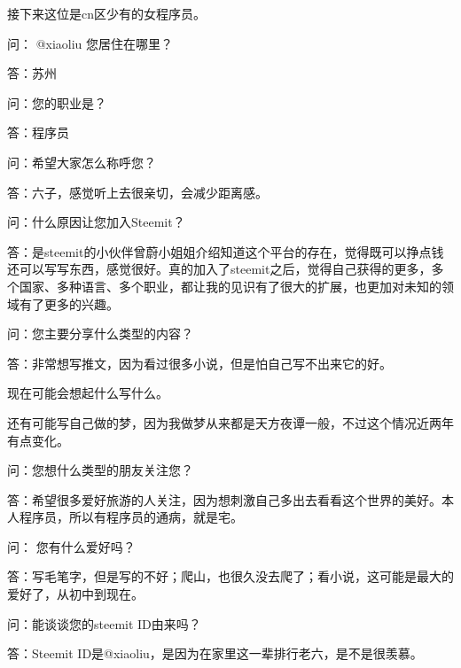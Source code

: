 \documentclass[]{ctexbook}
\begin{document}
接下来这位是cn区少有的女程序员。

问： @xiaoliu 您居住在哪里？

答：苏州

问：您的职业是？

答：程序员

问：希望大家怎么称呼您？

答：六子，感觉听上去很亲切，会减少距离感。

问：什么原因让您加入Steemit？

答：是steemit的小伙伴曾蔚小姐姐介绍知道这个平台的存在，觉得既可以挣点钱还可以写写东西，感觉很好。真的加入了steemit之后，觉得自己获得的更多，多个国家、多种语言、多个职业，都让我的见识有了很大的扩展，也更加对未知的领域有了更多的兴趣。

问：您主要分享什么类型的内容？

答：非常想写推文，因为看过很多小说，但是怕自己写不出来它的好。

现在可能会想起什么写什么。

还有可能写自己做的梦，因为我做梦从来都是天方夜谭一般，不过这个情况近两年有点变化。

问：您想什么类型的朋友关注您？

答：希望很多爱好旅游的人关注，因为想刺激自己多出去看看这个世界的美好。本人程序员，所以有程序员的通病，就是宅。

问： 您有什么爱好吗？

答：写毛笔字，但是写的不好；爬山，也很久没去爬了；看小说，这可能是最大的爱好了，从初中到现在。

问：能谈谈您的steemit ID由来吗？

答：Steemit ID是@xiaoliu，是因为在家里这一辈排行老六，是不是很羡慕。
\end{document}
